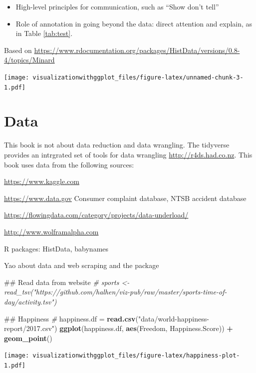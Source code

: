 \documentclass[]{krantz}
\makeatletter
\newenvironment{Shaded}{\begin{snugshade}}{\end{snugshade}}
\newcommand{\KeywordTok}[1]{\textcolor[rgb]{0.13,0.29,0.53}{\textbf{#1}}}
\newcommand{\StringTok}[1]{\textcolor[rgb]{0.31,0.60,0.02}{#1}}
\newcommand{\CommentTok}[1]{\textcolor[rgb]{0.56,0.35,0.01}{\textit{#1}}}
\newcommand{\OperatorTok}[1]{\textcolor[rgb]{0.81,0.36,0.00}{\textbf{#1}}}
\newcommand{\NormalTok}[1]{#1}
\providecommand{\tightlist}{%
  \setlength{\itemsep}{0pt}\setlength{\parskip}{0pt}}
\newenvironment{kframe}{%
\medskip{}
\setlength{\fboxsep}{.8em}
 \def\at@end@of@kframe{}%
 \ifinner\ifhmode%
  \def\at@end@of@kframe{\end{minipage}}%
  \begin{minipage}{\columnwidth}%
 \fi\fi%
 \def\FrameCommand##1{\hskip\@totalleftmargin \hskip-\fboxsep
 \colorbox{shadecolor}{##1}\hskip-\fboxsep
     \hskip-\linewidth \hskip-\@totalleftmargin \hskip\columnwidth}%
 \MakeFramed {\advance\hsize-\width
   \@totalleftmargin\z@ \linewidth\hsize
   \@setminipage}}%
 {\par\unskip\endMakeFramed%
 \at@end@of@kframe}
\renewenvironment{Shaded}{\begin{kframe}}{\end{kframe}}
\theoremstyle{definition}
\theoremstyle{definition}
\theoremstyle{definition}
\theoremstyle{remark}
\makeatother
\begin{document}
\begin{itemize}
\tightlist
\item
  High-level principles for communication, such as ``Show don't tell''
\item
  Role of annotation in going beyond the data: direct attention and
  explain, as in Table \ref{tab:test}.
\end{itemize}

Based on
\url{https://www.rdocumentation.org/packages/HistData/versions/0.8-4/topics/Minard}

\texttt{[image: visualizationwithggplot\_files/figure-latex/unnamed-chunk-3-1.pdf]}

\section{Data}\label{data}

This book is not about data reduction and data wrangling. The tidyverse
provides an intrgrated set of tools for data wrangling
\url{http://r4ds.had.co.nz}. This book uses data from the following
sources:

\url{https://www.kaggle.com}

\url{https://www.data.gov} Consumer complaint database, NTSB accident
database

\url{https://flowingdata.com/category/projects/data-underload/}

\url{http://www.wolframalpha.com}

R packages: HistData, babynames

Yao about data and web scraping and the package

\begin{Shaded}
\begin{Highlighting}[]
\NormalTok{## Read data from website}
\CommentTok{# sports <- read_tsv("https://github.com/halhen/viz-pub/raw/master/sports-time-of-day/activity.tsv")}


\NormalTok{## Happiness}
\CommentTok{# }
\NormalTok{happiness.df =}\StringTok{ }\KeywordTok{read.csv}\NormalTok{(}\StringTok{"data/world-happiness-report/2017.csv"}\NormalTok{)}
\KeywordTok{ggplot}\NormalTok{(happiness.df, }\KeywordTok{aes}\NormalTok{(Freedom, Happiness.Score)) }\OperatorTok{+}\StringTok{ }\KeywordTok{geom_point}\NormalTok{()}
\end{Highlighting}
\end{Shaded}

\texttt{[image: visualizationwithggplot\_files/figure-latex/happiness-plot-1.pdf]}
\end{document}
